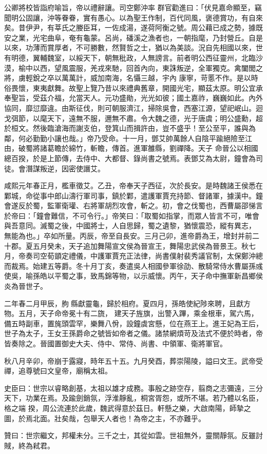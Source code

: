 \begin{pinyinscope}
 公卿將校皆詣府喻旨，帝以禮辭讓。司空鄭沖率
 群官勸進曰：「伏見嘉命顯至，竊聞明公固讓，沖等眷眷，實有愚心。以為聖王作制，百代同風，褒德賞功，有自來矣。昔伊尹，有莘氏之媵臣耳，一佐成湯，遂荷阿衡之號。周公藉已成之勢，據既安之業，光宅曲阜，奄有龜蒙。呂尚，磻溪之漁者也，一朝指麾，乃封營丘。自是以來，功薄而賞厚者，不可勝數，然賢哲之士，猶以為美談。況自先相國以來，世有明德，翼輔魏室，以綏天下，朝無秕政，人無謗言。前者明公西征靈州，北臨沙漠，榆中以西，望風震服，羌戎來馳，回首內向，東誅叛逆，全軍獨克。禽闔閭之將，虜輕銳之卒以萬萬計，威加南海，名懾三越，宇內
 康寧，苛慝不作。是以時俗畏懷，東夷獻舞。故聖上覽乃昔以來禮典舊章，開國光宅，顯茲太原。明公宜承奉聖旨，受茲介福，允當天人。元功盛勛，光光如彼；國土嘉祚，巍巍如此。內外協同，靡愆靡違。由斯征伐，則可朝服濟江，掃除吳會，西塞江源，望祀岷山。迴戈弭節，以麾天下，遠無不服，邇無不肅。令大魏之德，光于唐虞；明公盛勳，超於桓文。然後臨滄海而謝支伯，登箕山而揖許由，豈不盛乎！至公至平，誰與為鄰，何必勤勤小讓也哉。」帝乃受命。十一月，鄧艾帥萬餘人自陰平踰絕險至江由，破蜀將諸葛瞻於綿竹，斬瞻，傳首。進軍雒縣，劉禪降。天子
 命晉公以相國總百揆，於是上節傳，去侍中、大都督、錄尚書之號焉。表鄧艾為太尉，鐘會為司徒。會潛謀叛逆，因密使譖艾。



 咸熙元年春正月，檻車徵艾。乙丑，帝奉天子西征，次於長安。是時魏諸王侯悉在鄴城，命從事中郎山濤行軍司事，鎮於鄴，遣護軍賈充持節、督諸軍，據漢中。鐘會遂反於蜀，監軍衛瓘、右將軍胡烈攻會，斬之。初，會之伐蜀也，西曹屬邵悌言於帝曰：「鐘會難信，不可令行。」帝笑曰：「取蜀如指掌，而眾人皆言不可，唯會與吾意同。滅蜀之後，中國將士，人自思歸，蜀之遺黎，猶懷震恐，縱有異志，
 無能為也。」卒如所量。丙辰，帝至自長安。三月己卯，進帝爵為王，增封并前二十郡。夏五月癸未，天子追加舞陽宣文侯為晉宣王，舞陽忠武侯為晉景王。秋七月，帝奏司空荀顗定禮儀，中護軍賈充正法律，尚書僕射裴秀議官制，太保鄭沖總而裁焉。始建五等爵。冬十月丁亥，奏遣吳人相國參軍徐劭、散騎常侍水曹屬孫彧使吳，喻孫皓以平蜀之事，致馬錦等物，以示威懷。丙午，天子命中撫軍新昌鄉侯炎為晉世子。



 二年春二月甲辰，朐縣獻靈龜，歸於相府。夏四月，孫皓使紀陟來聘，且獻方物。五月，天子命帝冕十有二旒，
 建天子旌旗，出警入蹕，乘金根車，駕六馬，備五時副車，置旄頭雲罕，樂舞八佾，設鐘虡宮懸，位在燕王上。進王妃為王后，世子為太子，王女王孫爵命之號皆如帝者之儀。諸禁網煩苛及法式不便於時者，帝皆奏除之。晉國置御史大夫、侍中、常侍、尚書、中領軍、衛將軍官。



 秋八月辛卯，帝崩于露寢，時年五十五。九月癸酉，葬崇陽陵，謚曰文王。武帝受禪，追尊號曰文皇帝，廟稱太祖。



 史臣曰：世宗以睿略創基，太祖以雄才成務。事殷之跡空存，翦商之志彌遠，三分天下，功業在焉。及踰劍銷氛，浮淮靜亂，桐宮胥怨，或所不堪。若乃體以名臣，格之端
 揆，周公流連於此歲，魏武得意於茲日。軒懸之樂，大啟南陽，師摯之圖，於焉北面。壯矣哉，包舉天人者也！為帝之主，不亦難乎。



 贊曰：世宗繼文，邦權未分。三千之士，其從如雲。世祖無外，靈關靜氛。反雖討賊，終為弒君。



\end{pinyinscope}